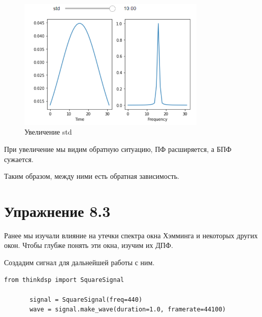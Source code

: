 \documentclass[a4paper,12pt]{report}
\begin{document}
\begin{figure}[H]
        \centering
        \includegraphics[width=0.8\textwidth]{fig2-3.PNG}
        \caption{Увеличение std}
        \label{fig:fig2-3}
\end{figure} 

    При увеличение мы видим обратную ситуацию, ПФ расширяется, а БПФ сужается.
    
    Таким образом, между ними есть обратная зависимость.
    
\chapter{Упражнение 8.3}
    Ранее мы изучали влияние на утечки спектра окна Хэмминга и некоторых других окон. Чтобы глубже понять эти окна, изучим их ДПФ.
    
    Создадим сигнал для дальнейшей работы с ним.
\begin{lstlisting}[caption=Создание сигнала]
       from thinkdsp import SquareSignal

       signal = SquareSignal(freq=440)
       wave = signal.make_wave(duration=1.0, framerate=44100)
\end{lstlisting}
    
\end{document}
